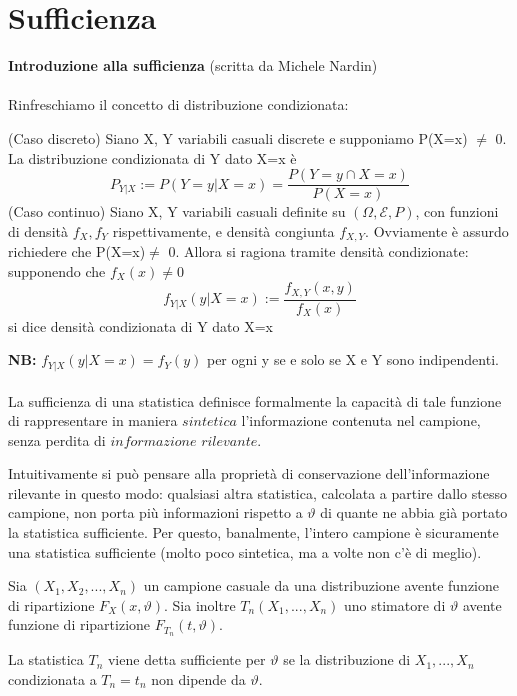 
\section{Sufficienza}

\textbf{Introduzione alla sufficienza} (scritta da Michele Nardin)\\
\\
Rinfreschiamo il concetto di distribuzione condizionata:
\begin{definizione} (Caso discreto)
Siano X, Y variabili casuali discrete e supponiamo P(X=x) $\neq$ 0.
La distribuzione condizionata di Y dato X=x è 
$$P_{Y|X} := P(Y = y | X=x) = \frac{P(Y=y \cap X=x)}{P(X=x)}$$
(Caso continuo) Siano X, Y variabili casuali definite su $(\Omega, \mathcal{E}, P)$, con funzioni di densità $f_X, f_Y$ rispettivamente, e densità congiunta $f_{X,Y}$. Ovviamente è assurdo richiedere che P(X=x)$\neq$ 0. Allora si ragiona tramite densità condizionate: supponendo che $f_X(x)\neq 0$
$$f_{Y|X}(y | X=x):= \frac{f_{X,Y}(x,y)}{f_X(x)}$$ si dice densità condizionata di Y dato X=x 
\end{definizione}
\noindent \textbf{NB:} $f_{Y|X}(y | X=x) = f_Y(y)$ per ogni y se e solo se X e Y sono indipendenti.\\
\\
La sufficienza di una statistica definisce formalmente la capacità di tale funzione di rappresentare in maniera $sintetica$ l'informazione contenuta nel campione, senza perdita di $informazione$ $rilevante$.

Intuitivamente si può pensare alla proprietà di conservazione dell'informazione rilevante in questo modo: qualsiasi altra statistica, calcolata a partire dallo stesso campione, non porta più informazioni rispetto a $\vartheta$ di quante ne abbia già portato la statistica sufficiente.
Per questo, banalmente, l'intero campione è sicuramente una statistica sufficiente (molto poco sintetica, ma a volte non c'è di meglio).

Sia $(X_1,X_2,...,X_n)$ un campione casuale da una distribuzione avente funzione di ripartizione $F_X(x,\vartheta)$. Sia inoltre $T_n(X_1,...,X_n)$ uno stimatore di $\vartheta$ avente funzione di ripartizione $F_{T_n}(t, \vartheta)$.\\

\begin{definizione}
La statistica $T_n$ viene detta sufficiente per $\vartheta$ se la distribuzione di $X_1,...,X_n$ condizionata a $T_n = t_n$ non dipende da $\vartheta$.
\end{definizione}

